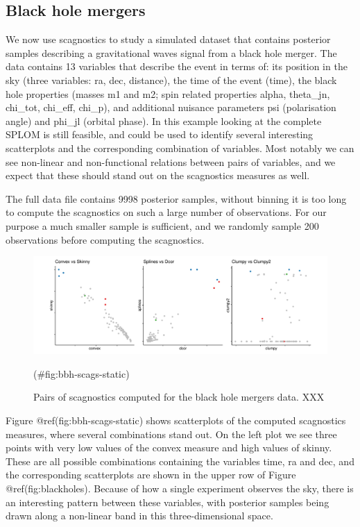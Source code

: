 \hypertarget{black-hole-mergers}{%
\subsection{Black hole mergers}\label{black-hole-mergers}}

We now use scagnostics to study a simulated dataset that contains
posterior samples describing a gravitational waves signal from a black
hole merger. The data contains 13 variables that describe the event in
terms of: its position in the sky (three variables: ra, dec, distance),
the time of the event (time), the black hole properties (masses m1 and
m2; spin related properties alpha, theta\_jn, chi\_tot, chi\_eff,
chi\_p), and additional nuisance parameters psi (polarisation angle) and
phi\_jl (orbital phase). In this example looking at the complete SPLOM
is still feasible, and could be used to identify several interesting
scatterplots and the corresponding combination of variables. Most
notably we can see non-linear and non-functional relations between pairs
of variables, and we expect that these should stand out on the
scagnostics measures as well.

The full data file contains 9998 posterior samples, without binning it
is too long to compute the scagnostics on such a large number of
observations. For our purpose a much smaller sample is sufficient, and
we randomly sample 200 observations before computing the scagnostics.

\begin{Schunk}
\begin{figure}
\includegraphics[width=1\linewidth]{mason-lee-laa-cook_files/figure-latex/bbh-scags-static-1} \caption[Pairs of scagnostics computed for the black hole mergers data]{Pairs of scagnostics computed for the black hole mergers data. XXX}(\#fig:bbh-scags-static)
\end{figure}
\end{Schunk}

Figure @ref(fig:bbh-scags-static) shows scatterplots of the computed
scagnostics measures, where several combinations stand out. On the left
plot we see three points with very low values of the convex measure and
high values of skinny. These are all possible combinations containing
the variables time, ra and dec, and the corresponding scatterplots are
shown in the upper row of Figure @ref(fig:blackholes). Because of how a
single experiment observes the sky, there is an interesting pattern
between these variables, with posterior samples being drawn along a
non-linear band in this three-dimensional space.

